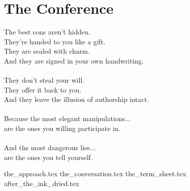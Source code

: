 \part{The Conference}

\vfill

\begin{flushright}
\Large
The best cons aren’t hidden.\\
They’re handed to you like a gift.\\
They are sealed with charm.\\
And they are signed in your own handwriting.\\
\ \\
They don’t steal your will.\\
They offer it back to you.\\
And they leave the illusion of authorship intact.\\
\ \\
Because the most elegant manipulations...\\ 
are the ones you willing participate in.\\
\ \\
And the most dangerous lies...\\
are the ones you tell yourself.\\
\end{flushright}


{the_approach.tex}
{the_conversation.tex}
{the_term_sheet.tex}
{after_the_ink_dried.tex}